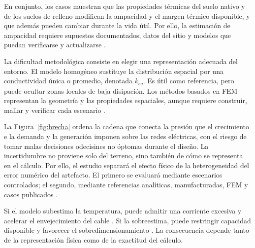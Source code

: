 En conjunto, los casos muestran que las propiedades térmicas del suelo nativo y de los suelos de relleno modifican la ampacidad y el margen térmico disponible, y que además pueden cambiar durante la vida útil. Por ello, la estimación de ampacidad requiere supuestos documentados, datos del sitio y modelos que puedan verificarse y actualizarse \parencites{fariz2026}{mobius2025}.

La dificultad metodológica consiste en elegir una representación adecuada del entorno. El modelo homogéneo sustituye la distribución espacial por una conductividad única o promedio, denotada $k_{eq}$. Es útil como referencia, pero puede ocultar zonas locales de baja disipación. Los métodos basados en FEM representan la geometría y las propiedades espaciales, aunque requiere construir, mallar y verificar cada escenario \parencites[3--4,93--99]{cigre2025}[1--3]{aldulaimi2024}. 

La Figura~\ref{fig:brecha} ordena la cadena que conecta la presión que el crecimiento e la demanda y la generación imponen sobre las redes eléctricas, con el riesgo de tomar malas decisiones odecisines no óptomas durante el diseño. La incertidumbre no proviene solo del terreno, sino también de cómo se representa en el cálculo. Por ello, el estudio separará el efecto físico de la heterogeneidad del error numérico del artefacto. El primero se evaluará mediante escenarios controlados; el segundo, mediante referencias analíticas, manufacturadas, FEM y casos publicados \parencites[4--6]{enescu2021}[3--4,93--99]{cigre2025}.

Si el modelo subestima la temperatura, puede admitir una corriente excesiva y acelerar el envejecimiento del cable \parencite[1--2,9]{khumalo2025}. Si la sobreestima, puede restringir capacidad disponible y favorecer el sobredimensionamiento \parencites[4--6]{enescu2021}[1--2,9]{khumalo2025}. La consecuencia depende tanto de la representación física como de la exactitud del cálculo.

\vspace{0.15cm}

